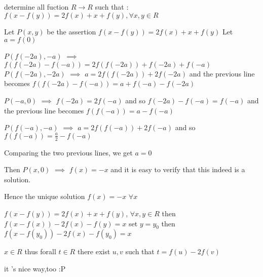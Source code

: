 \begin{solution}
	\begin{tcolorbox}determine all fuction $ R \to R$ such that :
$ f(x - f(y)) = 2f(x) + x + f(y), \forall x,y \in R$\end{tcolorbox}

Let $ P(x,y)$ be the assertion $ f(x-f(y))=2f(x)+x+f(y)$
Let $ a=f(0)$

$ P(f(-2a),-a)$ $ \implies$ $ f(f(-2a)-f(-a))=2f(f(-2a))+f(-2a)+f(-a)$
$ P(f(-2a),-2a)$ $ \implies$ $ a=2f(f(-2a))+2f(-2a)$ and the previous line becomes $ f(f(-2a)-f(-a))=a+f(-a)-f(-2a)$

$ P(-a,0)$ $ \implies$ $ f(-2a)=2f(-a)$ and so $ f(-2a)-f(-a)=f(-a)$ and the previous line becomes $ f(f(-a))=a-f(-a)$

$ P(f(-a),-a)$ $ \implies$ $ a=2f(f(-a))+2f(-a)$ and so $ f(f(-a))=\frac a2-f(-a)$

Comparing the two previous lines, we get $ a=0$

Then $ P(x,0)$ $ \implies$ $ f(x)=-x$ and it is easy to verify that this indeed is a solution.

Hence the unique solution $ \boxed{f(x)=-x}$ $ \forall x$
\end{solution}



\begin{solution}
	$ f(x - f(y)) = 2f(x) + x + f(y)$, $ \forall x,y \in R$
then $ f(x-f(x))-2f(x)-f(y)=x$
set $ y=y_0$ then  $ f(x-f(y_0))-2f(x)-f(y_0)=x$

$ x \in R$ thus forall $ t\in R$ there exist $ u,v$ such that $ t=f(u)-2f(v)$

it 's nice way,too :P
\end{solution}



